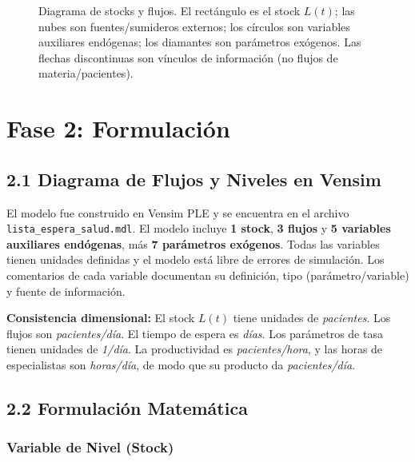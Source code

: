 \documentclass[12pt,a4paper]{article}
\begin{document}
\begin{figure}[H]
\caption{Diagrama de stocks y flujos. El rectángulo es el stock $L(t)$; las nubes son
  fuentes/sumideros externos; los círculos son variables auxiliares endógenas; los
  diamantes son parámetros exógenos. Las flechas discontinuas son vínculos de
  información (no flujos de materia/pacientes).}
\label{fig:stocks}
\end{figure}

\section{Fase 2: Formulación}

\subsection{2.1 Diagrama de Flujos y Niveles en Vensim}

El modelo fue construido en Vensim PLE y se encuentra en el archivo \texttt{lista\_espera\_salud.mdl}. El modelo incluye \textbf{1 stock}, \textbf{3 flujos} y \textbf{5 variables auxiliares endógenas}, más \textbf{7 parámetros exógenos}. Todas las variables tienen unidades definidas y el modelo está libre de errores de simulación. Los comentarios de cada variable documentan su definición, tipo (parámetro/variable) y fuente de información.

\begin{definicion}
\textbf{Consistencia dimensional:} El stock $L(t)$ tiene unidades de \textit{pacientes}. Los flujos son \textit{pacientes/día}. El tiempo de espera es \textit{días}. Los parámetros de tasa tienen unidades de \textit{1/día}. La productividad es \textit{pacientes/hora}, y las horas de especialistas son \textit{horas/día}, de modo que su producto da \textit{pacientes/día}.
\end{definicion}

\subsection{2.2 Formulación Matemática}

\subsubsection*{Variable de Nivel (Stock)}
\end{document}
